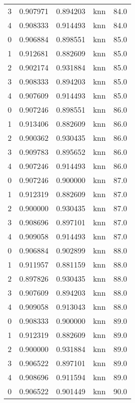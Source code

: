 \begin{tabular}{rrrlr}
     3 & 0.907971 & 0.894203 &      knn &       84.0 \\
     4 & 0.908333 & 0.914493 &      knn &       84.0 \\
     0 & 0.906884 & 0.898551 &      knn &       85.0 \\
     1 & 0.912681 & 0.882609 &      knn &       85.0 \\
     2 & 0.902174 & 0.931884 &      knn &       85.0 \\
     3 & 0.908333 & 0.894203 &      knn &       85.0 \\
     4 & 0.907609 & 0.914493 &      knn &       85.0 \\
     0 & 0.907246 & 0.898551 &      knn &       86.0 \\
     1 & 0.913406 & 0.882609 &      knn &       86.0 \\
     2 & 0.900362 & 0.930435 &      knn &       86.0 \\
     3 & 0.909783 & 0.895652 &      knn &       86.0 \\
     4 & 0.907246 & 0.914493 &      knn &       86.0 \\
     0 & 0.907246 & 0.900000 &      knn &       87.0 \\
     1 & 0.912319 & 0.882609 &      knn &       87.0 \\
     2 & 0.900000 & 0.930435 &      knn &       87.0 \\
     3 & 0.908696 & 0.897101 &      knn &       87.0 \\
     4 & 0.909058 & 0.914493 &      knn &       87.0 \\
     0 & 0.906884 & 0.902899 &      knn &       88.0 \\
     1 & 0.911957 & 0.881159 &      knn &       88.0 \\
     2 & 0.897826 & 0.930435 &      knn &       88.0 \\
     3 & 0.907609 & 0.894203 &      knn &       88.0 \\
     4 & 0.909058 & 0.913043 &      knn &       88.0 \\
     0 & 0.908333 & 0.900000 &      knn &       89.0 \\
     1 & 0.912319 & 0.882609 &      knn &       89.0 \\
     2 & 0.900000 & 0.931884 &      knn &       89.0 \\
     3 & 0.906522 & 0.897101 &      knn &       89.0 \\
     4 & 0.908696 & 0.911594 &      knn &       89.0 \\
     0 & 0.906522 & 0.901449 &      knn &       90.0 \\

\end{tabular}
